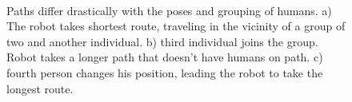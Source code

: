 \documentclass[12pt]{gatech-thesis}
\begin{document}
\begin{figure}[ht!]
\centering
         \\
        
    \caption{%
	Paths differ drastically with the poses and grouping of humans. a) The robot takes shortest route, traveling in the vicinity of a group of two and another individual. b) third individual joins the group. Robot takes a longer path that doesn't have humans on path. c) fourth person changes his position, leading the robot to take the longest route.
     }%
   \label{fig:sim}
\end{figure}
\end{document}
